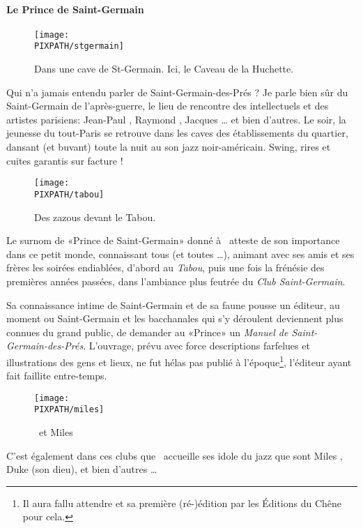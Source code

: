 \paragraph{Le Prince de Saint-Germain}

\begin{wrapfigure}{r}{.5\textwidth}
\centering
\texttt{[image: \\PIXPATH/stgermain]}
\caption{Dans une cave de St-Germain. Ici, le Caveau de la Huchette.}
\end{wrapfigure}
Qui n'a jamais entendu parler de Saint-Germain-des-Prés ? Je parle bien sûr
du Saint-Germain de l'après-guerre, le lieu de rencontre des intellectuels et
des artistes parisiens: Jean-Paul , Raymond , Jacques \ldots %
et bien d'autres. Le soir, la jeunesse du tout-Paris se retrouve dans les caves
des établissements du quartier, dansant (et buvant) toute la nuit au son jazz
noir-américain. Swing, rires et cuites garantis sur facture !


\begin{wrapfigure}{l}{.5\textwidth}
\centering
\texttt{[image: \\PIXPATH/tabou]}
\caption{Des zazous devant le Tabou.}
\end{wrapfigure}
Le surnom de «Prince de Saint-Germain» donné à \BV\ atteste de son importance
dans ce petit monde, connaissant tous (et toutes \ldots), animant avec ses amis et
ses frères les soirées endiablées, d'abord au \emph{Tabou}, puis une fois la
frénésie des premières années passées, dans l'ambiance plus feutrée du \emph{Club
Saint-Germain}.

Sa connaissance intime de Saint-Germain et de sa faune pousse un éditeur, au moment
ou Saint-Germain et les bacchanales qui s'y déroulent deviennent plus connues du
grand public, de demander au «Prince» un \emph{Manuel de Saint-Germain-des-Prés}.
L'ouvrage, prévu avec force descriptions farfelues et illustrations des gens et
lieux, ne fut hélas pas publié à l'époque\footnote{Il aura fallu attendre  et sa première (ré-)édition par les Éditions du Chêne pour cela. }, l'éditeur ayant fait faillite entre-temps.

\begin{figure}
\centering
\texttt{[image: \\PIXPATH/miles]}
\caption{\BV\ et Miles }
\end{figure}
C'est également dans ces clubs que \BV\ accueille ses idole du jazz que sont
Miles , Duke  (son dieu), et bien d'autres \ldots

